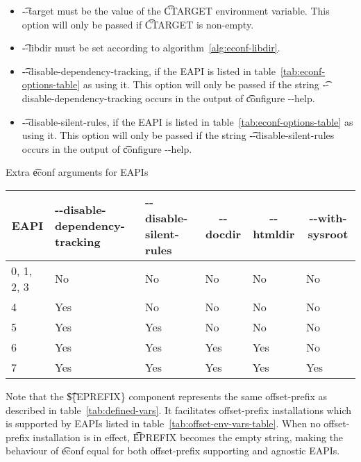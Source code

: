 \begin{description}
\begin{itemize}
    \item \t{-{}-target} must be the value of the \t{CTARGET} environment variable. This option will
        only be passed if \t{CTARGET} is non-empty.
    \item \t{-{}-libdir} must be set according to algorithm~\ref{alg:econf-libdir}.
    \item \t{-{}-disable-dependency-tracking}, if the EAPI is listed in
        table~\ref{tab:econf-options-table} as using it. This option will only be passed if the
        string \t{-{}-disable-dependency-tracking} occurs in the output of \t{configure -{}-help}.
    \item \t{-{}-disable-silent-rules}, if the EAPI is listed in table~\ref{tab:econf-options-table}
        as using it. This option will only be passed if the string \t{-{}-disable-silent-rules}
        occurs in the output of \t{configure -{}-help}.
    \end{itemize}

    \begin{centertable}{Extra \t{econf} arguments for EAPIs}
        \label{tab:econf-options-table}
        \begin{tabular}{llllll}
          \toprule
          \multicolumn{1}{c}{\textbf{EAPI}} &
          \multicolumn{1}{P{9em}}{\textbf{-{}-disable-dependency-tracking}} &
          \multicolumn{1}{P{5em}}{\textbf{-{}-disable-silent-rules}} &
          \multicolumn{1}{c}{\textbf{-{}-docdir}} &
          \multicolumn{1}{c}{\textbf{-{}-htmldir}} &
          \multicolumn{1}{c}{\textbf{-{}-with-sysroot}} \\
          \midrule
          0, 1, 2, 3        & No  & No  & No  & No  & No  \\
          4                 & Yes & No  & No  & No  & No  \\
          5                 & Yes & Yes & No  & No  & No  \\
          6                 & Yes & Yes & Yes & Yes & No  \\
          7                 & Yes & Yes & Yes & Yes & Yes \\
          \bottomrule
        \end{tabular}
    \end{centertable}

    Note that the \t{\$\{EPREFIX\}} component represents the same offset-prefix as described in
    table~\ref{tab:defined-vars}. It facilitates offset-prefix installations which is supported by
    EAPIs listed in table~\ref{tab:offset-env-vars-table}. When no offset-prefix installation is in
    effect, \t{EPREFIX} becomes the empty string, making the behaviour of \t{econf} equal for both
    offset-prefix supporting and agnostic EAPIs.


\end{description}
